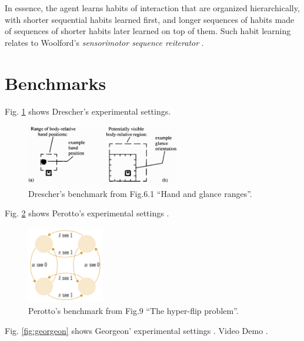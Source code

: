\documentclass[runningheads]{llncs}
\begin{document}
In essence, the agent learns habits of interaction that are organized hierarchically, with shorter sequential habits learned first, and longer sequences of habits made of sequences of shorter habits later learned on top of them. 
Such habit learning relates to Woolford's \textit{sensorimotor sequence reiterator} \cite{woolford_precarious_2020}.

\section{Benchmarks}
\label{sec:benchmarks}

Fig. \ref{fig:drescher2} shows Drescher's experimental settings.


\begin{figure}
	\centering
	\includegraphics[width=0.6\textwidth]{Figure_drescher_expe.png}
	\caption{Drescher's benchmark from \cite{drescher_made-up_1991} Fig.6.1 ``Hand and glance ranges''.} 
	\label{fig:drescher2}
\end{figure}

Fig. \ref{fig:perotto_ben} shows Perotto's experimental settings \cite{perotto_computational_nodate}.


\begin{figure}
	\centering
	\includegraphics[width=0.3\textwidth]{Figure_perotto_benchmark.png}
	\caption{Perotto's benchmark from \cite{perotto_computational_nodate} Fig.9 ``The hyper-flip problem''.} 
	\label{fig:perotto_ben}
\end{figure}




Fig. \ref{fig:georgeon} shows Georgeon' experimental settings \cite{georgeon_intrinsically-motivated_2012}.
Video Demo \cite{georgeon_video_2012}.
\end{document}
